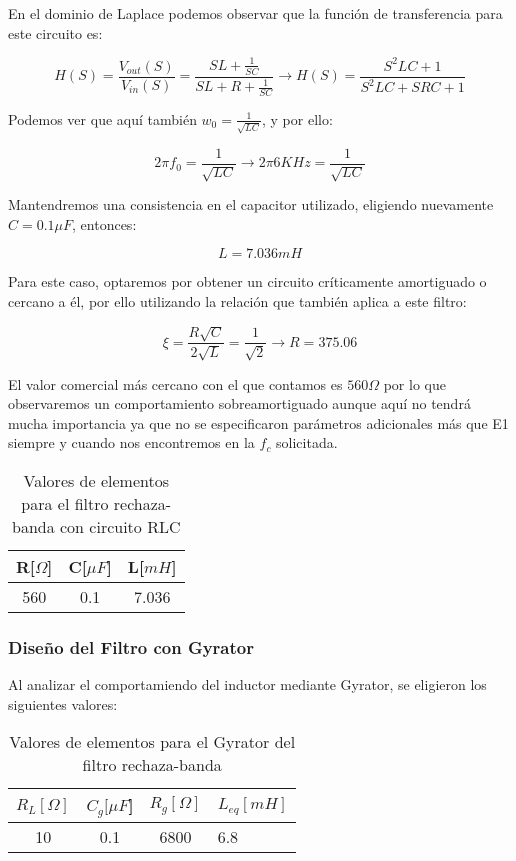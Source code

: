 En el dominio de Laplace podemos observar que la función de transferencia para este circuito es:

$$H(S)=\frac{V_{out}(S)}{V_{in}(S)}=\frac{SL+\frac{1}{SC}}{SL+R+\frac{1}{SC}} \longrightarrow H(S)=\frac{S^{2}LC+1}{S^2LC+SRC+1}$$

Podemos ver que aquí también $w_0=\frac{1}{\sqrt{LC}}$, y por ello:

$$2 \pi f_0 = \frac{1}{\sqrt{LC}} \longrightarrow 2 \pi 6KHz = \frac{1}{\sqrt{LC}}$$

Mantendremos una consistencia en el capacitor utilizado, eligiendo nuevamente $C=0.1 \mu F$, entonces:

$$L = 7.036 mH$$

Para este caso, optaremos por obtener un circuito críticamente amortiguado o cercano a él, por ello utilizando la relación que también aplica a este
filtro:

$$\xi=\frac{R \sqrt{C}}{2\sqrt{L}}=\frac{1}{\sqrt{2}} \longrightarrow R=375.06$$

El valor comercial más cercano con el que contamos es $560 \Omega$ por lo que observaremos un comportamiento sobreamortiguado aunque aquí
no tendrá mucha importancia ya que no se especificaron parámetros adicionales más que E1 siempre y cuando nos encontremos en la $f_c$ solicitada.

\begin{table}[H]
    \centering
    \begin{tabular}{|c|c|c|}
    \hline
    \rowcolor[HTML]{C0C0C0} 
    R[$\Omega$] & C[$\mu F$] & L[$mH$]  \\ \hline
    560     & 0.1  & 7.036 \\ \hline
    \end{tabular}
    \caption{Valores de elementos para el filtro rechaza-banda con circuito RLC}
    \end{table}

\subsubsection{Diseño del Filtro con Gyrator}

Al analizar el comportamiendo del inductor mediante Gyrator, se eligieron los siguientes valores:

\begin{table}[H]
    \centering
    \begin{tabular}{|c|c|c|l|}
    \hline
    \rowcolor[HTML]{C0C0C0} 
    $R_L[\Omega]$ & $C_g[\mu F$] & $R_g[\Omega]$  & $L_{eq}[mH]$ \\ \hline
    10      & 0.1  & 6800 & 6.8        \\ \hline
    \end{tabular}
    \caption{Valores de elementos para el Gyrator del filtro rechaza-banda}
    \end{table}

